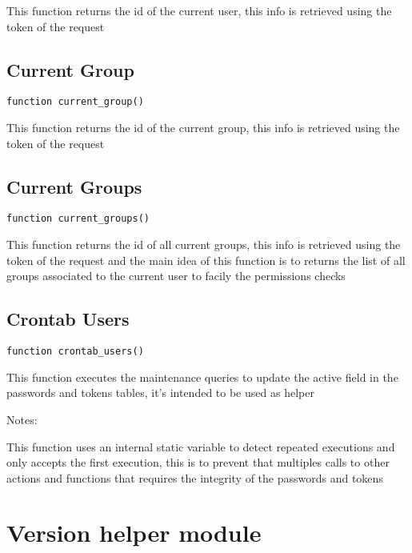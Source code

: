 \documentclass[a4paper]{book}
\begin{document}
This function returns the id of the current user, this info is retrieved
using the token of the request

\hypertarget{toc284}{}
\subsection{Current Group}

\begin{lstlisting}
function current_group()
\end{lstlisting}

This function returns the id of the current group, this info is retrieved
using the token of the request

\hypertarget{toc285}{}
\subsection{Current Groups}

\begin{lstlisting}
function current_groups()
\end{lstlisting}

This function returns the id of all current groups, this info is retrieved
using the token of the request and the main idea of this function is to
returns the list of all groups associated to the current user to facily the
permissions checks

\hypertarget{toc286}{}
\subsection{Crontab Users}

\begin{lstlisting}
function crontab_users()
\end{lstlisting}

This function executes the maintenance queries to update the active field
in the passwords and tokens tables, it's intended to be used as helper

Notes:

This function uses an internal static variable to detect repeated executions
and only accepts the first execution, this is to prevent that multiples calls
to other actions and functions that requires the integrity of the passwords
and tokens

\hypertarget{toc287}{}
\section{Version helper module}
\end{document}
